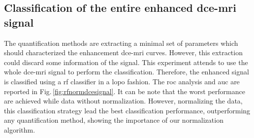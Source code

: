 

\subsection{Classification of the entire enhanced \acs*{dce}-\acs*{mri} signal}

The quantification methods are extracting a minimal set of parameters which should characterized the enhancement \ac{dce}-\ac{mri} curves.
However, this extraction could discard some information of the signal.
This experiment attends to use the whole \ac{dce}-\ac{mri} signal to perform the classification.
Therefore, the enhanced signal is classified using a \ac{rf} classifier in a \ac{lopo} fashion.
The \ac{roc} analysis and \ac{auc} are reported in Fig.\,\ref{fig:rfnormdcesignal}.
It can be note that the worst performance are achieved while data without normalization.
However, normalizing the data, this classification strategy lead the best classification performance, outperforming any quantification method, showing the importance of our normalization algorithm.

